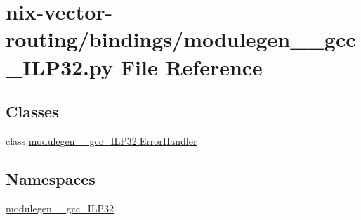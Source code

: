 \hypertarget{nix-vector-routing_2bindings_2modulegen____gcc__ILP32_8py}{}\section{nix-\/vector-\/routing/bindings/modulegen\+\_\+\+\_\+gcc\+\_\+\+I\+L\+P32.py File Reference}
\label{nix-vector-routing_2bindings_2modulegen____gcc__ILP32_8py}
\subsection*{Classes}
\begin{DoxyCompactItemize}
\item 
class \hyperlink{classmodulegen____gcc__ILP32_1_1ErrorHandler}{modulegen\+\_\+\+\_\+gcc\+\_\+\+I\+L\+P32.\+Error\+Handler}
\end{DoxyCompactItemize}
\subsection*{Namespaces}
\begin{DoxyCompactItemize}
\item 
 \hyperlink{namespacemodulegen____gcc__ILP32}{modulegen\+\_\+\+\_\+gcc\+\_\+\+I\+L\+P32}
\end{DoxyCompactItemize}
